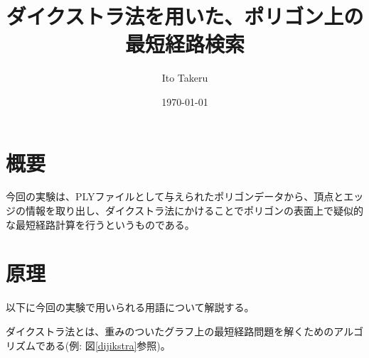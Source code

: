 \documentclass[a4paper,11pt]{jsarticle}
\begin{document}
\title{ダイクストラ法を用いた、ポリゴン上の最短経路検索}
\author{Ito Takeru}
\date{\today}
\maketitle




\section{概要}
今回の実験は、PLYファイルとして与えられたポリゴンデータから、頂点とエッジの情報を取り出し、ダイクストラ法にかけることでポリゴンの表面上で疑似的な最短経路計算を行うというものである。

\section{原理}

以下に今回の実験で用いられる用語について解説する。

ダイクストラ法とは、重みのついたグラフ上の最短経路問題を解くためのアルゴリズムである(例: 図\ref{dijikstra}参照)。
\end{document}
